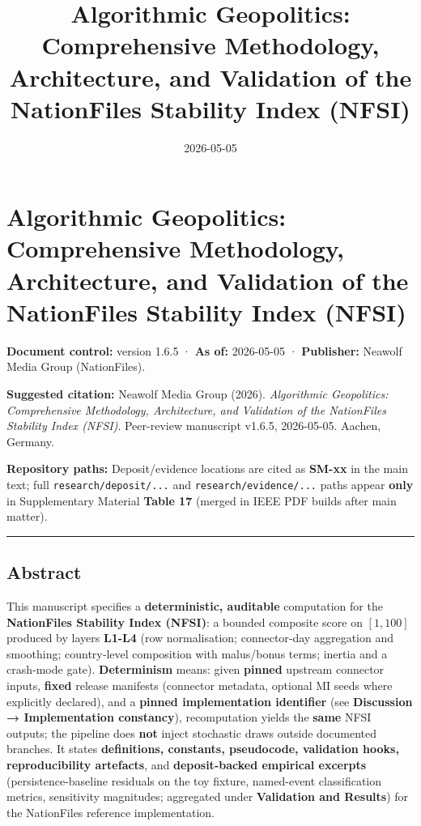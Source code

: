 \documentclass[
  11pt,
  peerreview,journal,onecolumn]{IEEEtran}
\title{Algorithmic Geopolitics: Comprehensive Methodology, Architecture,
and Validation of the NationFiles Stability Index (NFSI)}
\author{}
\date{2026-05-05}
\newcommand{\passthrough}[1]{#1}
\begin{document}
\maketitle

\hypertarget{algorithmic-geopolitics-comprehensive-methodology-architecture-and-validation-of-the-nationfiles-stability-index-nfsi}{%
\section{Algorithmic Geopolitics: Comprehensive Methodology,
Architecture, and Validation of the NationFiles Stability Index
(NFSI)}\label{algorithmic-geopolitics-comprehensive-methodology-architecture-and-validation-of-the-nationfiles-stability-index-nfsi}}

\textbf{Document control:} version 1.6.5 · \textbf{As of:} 2026-05-05 ·
\textbf{Publisher:} Neawolf Media Group (NationFiles).

\textbf{Suggested citation:} Neawolf Media Group (2026).
\emph{Algorithmic Geopolitics: Comprehensive Methodology, Architecture,
and Validation of the NationFiles Stability Index (NFSI)}. Peer-review
manuscript v1.6.5, 2026-05-05. Aachen, Germany.

\textbf{Repository paths:} Deposit/evidence locations are cited as
\textbf{SM-xx} in the main text; full
\passthrough{\lstinline!research/deposit/...!} and
\passthrough{\lstinline!research/evidence/...!} paths appear
\textbf{only} in Supplementary Material \textbf{Table 17} (merged in
IEEE PDF builds after main matter).

\begin{center}\rule{0.5\linewidth}{0.5pt}\end{center}

\hypertarget{abstract}{%
\subsection{Abstract}\label{abstract}}

This manuscript specifies a \textbf{deterministic, auditable}
computation for the \textbf{NationFiles Stability Index (NFSI)}: a
bounded composite score on \([1,100]\) produced by layers \textbf{L1-L4}
(row normalisation; connector‑day aggregation and smoothing;
country‑level composition with malus/bonus terms; inertia and a
crash‑mode gate). \textbf{Determinism} means: given \textbf{pinned}
upstream connector inputs, \textbf{fixed} release manifests (connector
metadata, optional MI seeds where explicitly declared), and a
\textbf{pinned implementation identifier} (see \textbf{Discussion →
Implementation constancy}), recomputation yields the \textbf{same} NFSI
outputs; the pipeline does \textbf{not} inject stochastic draws outside
documented branches. It states \textbf{definitions, constants,
pseudocode, validation hooks, reproducibility artefacts}, and
\textbf{deposit-backed empirical excerpts} (persistence-baseline
residuals on the toy fixture, named-event classification metrics,
sensitivity magnitudes; aggregated under \textbf{Validation and
Results}) for the NationFiles reference implementation.
\end{document}
